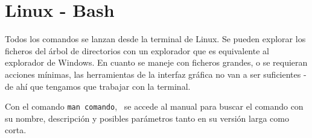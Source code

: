 \chapter{Linux - Bash}
Todos los comandos se lanzan desde la terminal de Linux. Se pueden explorar los ficheros del árbol de directorios con un explorador que es equivalente al explorador de Windows. En cuanto se maneje con ficheros grandes, o se requieran acciones mínimas, las herramientas de la interfaz gráfica no van a ser suficientes - de ahí que tengamos que trabajar con la terminal. 

Con el comando \texttt{man comando},   \ se accede al manual para buscar el comando con su nombre, descripción y posibles parámetros tanto en su versión larga como corta.

